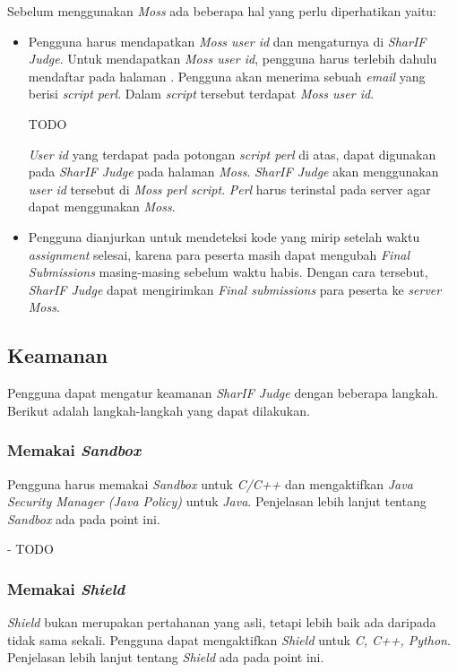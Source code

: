 Sebelum menggunakan \textit{Moss} ada beberapa hal yang perlu diperhatikan yaitu:

\begin{itemize}
	\item Pengguna harus mendapatkan \textit{Moss user id} dan mengaturnya di \textit{SharIF Judge}. Untuk mendapatkan \textit{Moss user id}, pengguna harus terlebih dahulu mendaftar pada halaman . Pengguna akan menerima sebuah \textit{email} yang berisi \textit{script perl}. Dalam \textit{script} tersebut terdapat \textit{Moss user id}.
	
	TODO
	
	\textit{User id} yang terdapat pada potongan \textit{script perl} di atas, dapat digunakan pada \textit{SharIF Judge} pada halaman \textit{Moss}. \textit{SharIF Judge} akan menggunakan \textit{user id} tersebut di \textit{Moss perl script}. \textit{Perl} harus terinstal pada server agar dapat menggunakan \textit{Moss}.  
	
	\item Pengguna dianjurkan untuk mendeteksi kode yang mirip setelah waktu \textit{assignment} selesai, karena para peserta masih dapat mengubah \textit{Final Submissions} masing-masing sebelum waktu habis. Dengan cara tersebut, \textit{SharIF Judge} dapat mengirimkan \textit{Final submissions} para peserta ke \textit{server Moss}.
\end{itemize}

\subsection{Keamanan}
Pengguna dapat mengatur keamanan \textit{SharIF Judge} dengan beberapa langkah. Berikut adalah langkah-langkah yang dapat dilakukan.

\subsubsection{Memakai \textit{Sandbox}}
Pengguna harus memakai \textit{Sandbox} untuk \textit{C/C++} dan mengaktifkan \textit{Java Security Manager (Java Policy)} untuk \textit{Java}. Penjelasan lebih lanjut tentang \textit{Sandbox} ada pada point ini.

- TODO

\subsubsection{Memakai \textit{Shield}}
\textit{Shield} bukan merupakan pertahanan yang asli, tetapi lebih baik ada daripada tidak sama sekali. Pengguna dapat mengaktifkan \textit{Shield} untuk \textit{C, C++, Python}. Penjelasan lebih lanjut tentang \textit{Shield} ada pada point ini.

